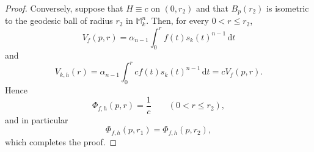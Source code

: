\documentclass[10pt,a4paper]{amsart}
\newcommand{\dd}{\,\mathrm{d}}
\begin{document}
\begin{proof}
Conversely, suppose that \(H\equiv c\) on \((0,r_2)\) and that \(B_p(r_2)\) is isometric to the geodesic ball of radius $r_2$ in $\mathbb{M}_k^n$. Then, for every \(0<r\leq r_2\),
\[
V_f(p,r)
=
\alpha_{n-1}\int_0^r f(t)s_k(t)^{n-1}\dd t
\]
and
\[
V_{k,h}(r)
=
\alpha_{n-1}\int_0^r c f(t)s_k(t)^{n-1}\dd t
=
cV_f(p,r).
\]
Hence
\[
\Phi_{f,h}(p,r)=\frac1c
\qquad (0<r\leq r_2),
\]
and in particular
\[
\Phi_{f,h}(p,r_1)=\Phi_{f,h}(p,r_2),
\]
which completes the proof.


\end{proof}
\end{document}
